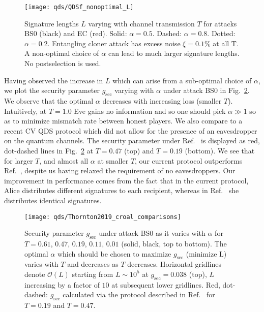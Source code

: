 \begin{figure}[htp]
\centering
\texttt{[image: qds/QDSf\_nonoptimal\_L]}
\caption{\label{fig:qds_nonoptimal_L} Signature lengths $L$ varying with channel transmission $T$ for attacks BS$0$ (black) and EC (red). Solid: $\alpha=0.5$. Dashed: $\alpha=0.8$. Dotted: $\alpha=0.2$. Entangling cloner attack has excess noise $\xi = 0.1\%$ at all T. A non-optimal choice of $\alpha$ can lead to much larger signature lengths. No postselection is used.}
\end{figure}


Having observed the increase in $L$ which can arise from a sub-optimal choice of $\alpha$, we plot the security parameter $g_{\text{sec}}$ varying with $\alpha$ under attack BS$0$ in Fig.~\ref{fig:qds_gsec_croal}. We observe that the optimal $\alpha$ decreases with increasing loss (smaller $T$). Intuitively, at $T=1.0$ Eve gains no information and so one should pick $\alpha \gg 1$ so as to minimize mismatch rate between honest players. We also compare to a recent CV QDS protocol \cite{Croal2016} which did not allow for the presence of an eavesdropper on the quantum channels. The security parameter under Ref.~\cite{Croal2016} is displayed as red, dot-dashed lines in Fig.~\ref{fig:qds_gsec_croal} at $T=0.47$ (top) and $T=0.19$ (bottom). We see that for larger $T$, and almost all $\alpha$ at smaller $T$, our current protocol outperforms Ref.~\cite{Croal2016}, despite us having relaxed the requirement of no eavesdroppers. Our improvement in performance comes from the fact that in the current protocol, Alice distributes different signatures to each recipient, whereas in Ref.~\cite{Croal2016} she distributes identical signatures.

\begin{figure}[htp]
\centering
\texttt{[image: qds/Thornton2019\_croal\_comparisons]}
\caption{\label{fig:qds_gsec_croal} Security parameter $g_{\text{sec}}$ under attack BS$0$ as it varies with $\alpha$ for $T = 0.61$, $0.47$, $0.19$, $0.11$, $0.01$ (solid, black, top to bottom). The optimal $\alpha$ which should be chosen to maximize $g_{\text{sec}}$ (minimize L) varies with $T$ and decreases as $T$ decreases. Horizontal gridlines denote $\mathcal{O}\left(L\right)$ starting from $L \sim 10^5$ at $g_{\text{sec}} = 0.038$ (top), $L$ increasing by a factor of $10$ at subsequent lower gridlines. Red, dot-dashed: $g_{\text{sec}}$ calculated via the protocol described in Ref.~\cite{Croal2016} for $T=0.19$ and $T=0.47$.}
\end{figure}

